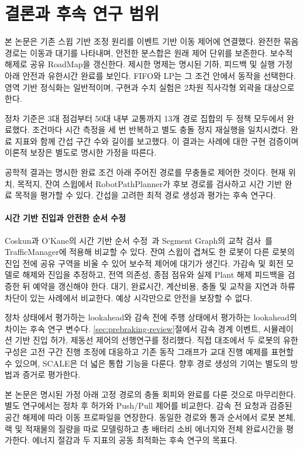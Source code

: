\documentclass[11pt,a4paper]{article}
\theoremstyle{remark}
\begin{document}
\section{결론과 후속 연구 범위}
본 논문은 기존 스윕 기반 조정 원리를 이벤트 기반 이동 제어에 연결했다. 완전한 묶음경로는 이동과 대기를 나타내며, 안전한 분스합은 원래 제어 단위를 보존한다. 보수적 해제로 공유 RoadMap을 갱신한다. 제시한 명제는 명시된 기하, 피드백 및 실행 가정 아래 안전과 유한시간 완료를 보인다. FIFO와 LP는 그 조건 안에서 동작을 선택한다. 영역 기반 정식화는 일반적이며, 구현과 수치 실험은 2차원 직사각형 외곽을 대상으로 한다.

정차 기준은 3대 점검부터 50대 내부 교통까지 13개 경로 집합의 두 정책 모두에서 완료했다. 조건마다 시간 측정을 세 번 반복하고 별도 충돌 정지 재실행을 일치시켰다. 완료 지표와 함께 간섭 구간 수와 길이를 보고했다. 이 결과는 사례에 대한 구현 검증이며 이론적 보장은 별도로 명시한 가정을 따른다.

공학적 결과는 명시한 완료 조건 아래 주어진 경로를 무충돌로 제어한 것이다. 현재 위치, 목적지, 잔여 스윕에서 RobotPathPlanner가 후보 경로를 검사하고 시간 기반 완료 목적을 평가할 수 있다. 간섭을 고려한 최적 경로 생성과 평가는 후속 연구다.

\paragraph{시간 기반 진입과 안전한 순서 수정}
Coskun과 O'Kane의 시간 기반 순서 수정~\cite{coskun2019}과 Segment Graph의 교착 검사~\cite{coskun2021}를 TrafficManager에 적용해 비교할 수 있다. 잔여 스윕이 겹쳐도 한 로봇이 다른 로봇의 진입 전에 공유 구역을 비울 수 있어 보수적 제어에 대기가 생긴다. 가감속 및 회전 모델로 해제와 진입을 추정하고, 전역 의존성, 종점 점유와 실제 Plant 해제 피드백을 검증한 뒤 예약을 갱신해야 한다. 대기, 완료시간, 계산비용, 충돌 및 교착을 지연과 하류 차단이 있는 사례에서 비교한다. 예상 시각만으로 안전을 보장할 수 없다.

정차 상태에서 평가하는 lookahead와 감속 전에 주행 상태에서 평가하는 lookahead의 차이는 후속 연구 변수다. \ref{sec:prebraking-review}절에서 감속 경계 이벤트, 시뮬레이션 기반 진입 허가, 제동선 제어의 선행연구를 정리했다. 직접 대조에서 두 로봇의 유한 구성은 고전 구간 진행 조정에 대응하고 기존 동작 그래프가 교대 진행 예제를 표현할 수 있으며, SCALE은 더 넓은 통합 기능을 다룬다. 향후 경로 생성의 기여는 별도의 방법과 증거로 평가한다.

본 논문은 명시된 가정 아래 고정 경로의 충돌 회피와 완료를 다룬 것으로 마무리한다. 별도 연구에서는 정차 후 허가와 Push/Pull 제어를 비교한다. 감속 전 요청과 검증된 공간 해제에 따라 이동 프로파일을 연장한다. 동일한 경로와 통과 순서에서 로봇 본체, 랙 및 적재물의 질량을 따로 모델링하고 총 배터리 소비 에너지와 전체 완료시간을 평가한다. 에너지 절감과 두 지표의 공동 최적화는 후속 연구의 목표다.
\end{document}
